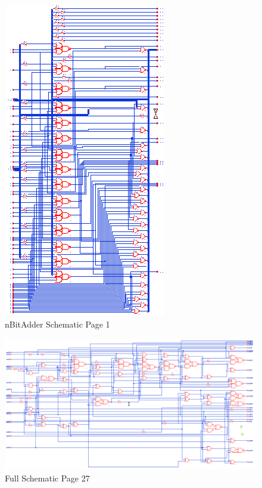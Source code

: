 \documentclass[11pt]{article}
\begin{document}
	
	\begin{figure}[H] 
		\centering 
		\includegraphics[width=0.7\linewidth]{"Pictures/nBitAdder Schematic Page 1"}
		\caption{nBitAdder Schematic Page 1} 
		\label{fig:nBitAdder-Schematic-Page-1} 
	\end{figure}
	
	
	\begin{figure}[H] 
		\centering 
		\includegraphics[width=0.7\linewidth]{"Pictures/Full Schematic Page 27"}
		\caption{Full Schematic Page 27} 
		\label{fig:Full-Schematic-Page-27} 
	\end{figure}
	
\end{document}
